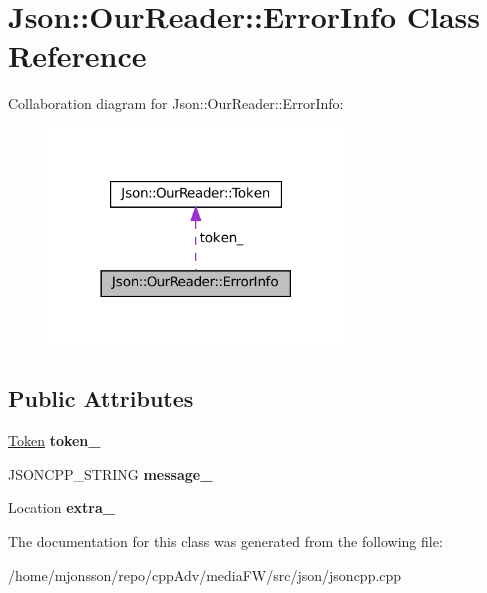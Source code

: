 \hypertarget{classJson_1_1OurReader_1_1ErrorInfo}{}\section{Json\+:\+:Our\+Reader\+:\+:Error\+Info Class Reference}
\label{classJson_1_1OurReader_1_1ErrorInfo}


Collaboration diagram for Json\+:\+:Our\+Reader\+:\+:Error\+Info\+:
\nopagebreak
\begin{figure}[H]
\begin{center}
\leavevmode
\includegraphics[width=222pt]{classJson_1_1OurReader_1_1ErrorInfo__coll__graph}
\end{center}
\end{figure}
\subsection*{Public Attributes}
\begin{DoxyCompactItemize}
\item 
\mbox{\label{classJson_1_1OurReader_1_1ErrorInfo_ad05204ecabe5e7201a842935b874ae9a}} 
\hyperlink{classJson_1_1OurReader_1_1Token}{Token} {\bfseries token\+\_\+}
\item 
\mbox{\label{classJson_1_1OurReader_1_1ErrorInfo_af14b6bf58ee1cb3388c18ee336ee2394}} 
J\+S\+O\+N\+C\+P\+P\+\_\+\+S\+T\+R\+I\+NG {\bfseries message\+\_\+}
\item 
\mbox{\label{classJson_1_1OurReader_1_1ErrorInfo_a77ba2d32a471c7b9bc14621b76a5bdab}} 
Location {\bfseries extra\+\_\+}
\end{DoxyCompactItemize}


The documentation for this class was generated from the following file\+:\begin{DoxyCompactItemize}
\item 
/home/mjonsson/repo/cpp\+Adv/media\+F\+W/src/json/jsoncpp.\+cpp\end{DoxyCompactItemize}
